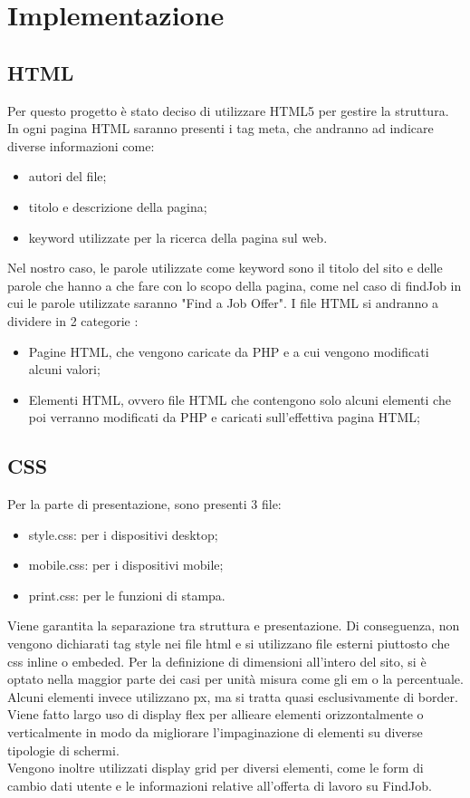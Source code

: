 \section{Implementazione}
	

  \subsection{HTML}
  Per questo progetto è stato deciso di utilizzare HTML5 per gestire la struttura. \\
  In ogni pagina HTML saranno presenti i tag meta, che andranno ad indicare diverse informazioni come:
  \begin{itemize}
    \item autori del file;
    \item titolo e descrizione della pagina;
    \item keyword utilizzate per la ricerca della pagina sul web.
  \end{itemize}
  Nel nostro caso, le parole utilizzate come keyword sono il titolo del sito e delle parole che hanno a che fare con lo scopo della pagina, come nel caso di findJob in cui le parole utilizzate saranno "Find a Job Offer".
  I file HTML si andranno a dividere in 2 categorie :
  \begin{itemize}
    \item Pagine HTML, che vengono caricate da PHP e a cui vengono modificati alcuni valori;
    \item Elementi HTML, ovvero file HTML che contengono solo alcuni elementi che poi verranno modificati da PHP e caricati sull'effettiva pagina HTML;
  \end{itemize}

  
  \subsection{CSS}
  Per la parte di presentazione, sono presenti 3 file:
  \begin{itemize}
    \item style.css: per i dispositivi desktop;
    \item mobile.css: per i dispositivi mobile;
    \item print.css: per le funzioni di stampa.
  \end{itemize}
  Viene garantita la separazione tra struttura e presentazione. Di conseguenza, non vengono dichiarati tag style nei file html e si utilizzano file esterni piuttosto che css inline o embeded.
  Per la definizione di dimensioni all'intero del sito, si è optato nella maggior parte dei casi per unità misura come gli em o la percentuale. Alcuni elementi invece utilizzano px, ma si tratta quasi esclusivamente di border.\\
  Viene fatto largo uso di display flex per allieare elementi orizzontalmente o verticalmente in modo da migliorare l'impaginazione di elementi su diverse tipologie di schermi. \\
  Vengono inoltre utilizzati display grid per diversi elementi, come le form di cambio dati utente e le informazioni relative all'offerta di lavoro su FindJob.
  
